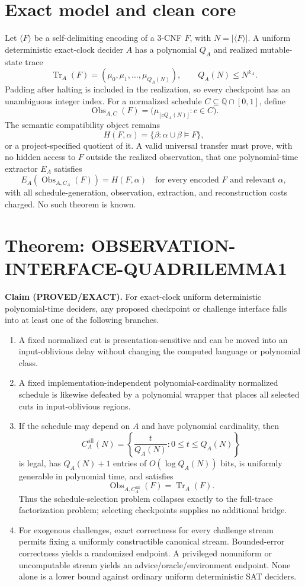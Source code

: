 \documentclass[11pt]{article}
\newcommand{\EXACT}{\textsf{PROVED/EXACT}}
\begin{document}
\section*{Exact model and clean core}
Let $\langle F\rangle$ be a self-delimiting encoding of a 3-CNF $F$, with
$N=|\langle F\rangle|$.  A uniform deterministic exact-clock decider $A$ has a
polynomial $Q_A$ and realized mutable-state trace
\[
  \operatorname{Tr}_A(F)=(\mu_0,\mu_1,\ldots,\mu_{Q_A(N)}),
  \qquad Q_A(N)\le N^{k_A}.
\]
Padding after halting is included in the realization, so every checkpoint has
an unambiguous integer index.  For a normalized schedule
$C\subseteq\mathbb{Q}\cap[0,1]$, define
\[
  \operatorname{Obs}_{A,C}(F)
   =\bigl(\mu_{\lfloor cQ_A(N)\rfloor}:c\in C\bigr).
\]
The semantic compatibility object remains
\[
  H(F,\alpha)=\{\beta:\alpha\cup\beta\models F\},
\]
or a project-specified quotient of it.  A valid universal transfer must prove,
with no hidden access to $F$ outside the realized observation, that one
polynomial-time extractor $E_A$ satisfies
\[
  E_A(\operatorname{Obs}_{A,C_A}(F))=H(F,\alpha)
  \quad\text{for every encoded }F\text{ and relevant }\alpha,
\]
with all schedule-generation, observation, extraction, and reconstruction
costs charged.  No such theorem is known.

\section*{Theorem: OBSERVATION-INTERFACE-QUADRILEMMA1}
\textbf{Claim (\EXACT).}  For exact-clock uniform deterministic polynomial-time
deciders, any proposed checkpoint or challenge interface falls into at least
one of the following branches.

\begin{enumerate}
\item A fixed normalized cut is presentation-sensitive and can be moved into
an input-oblivious delay without changing the computed language or polynomial
class.
\item A fixed implementation-independent polynomial-cardinality normalized
schedule is likewise defeated by a polynomial wrapper that places all selected
cuts in input-oblivious regions.
\item If the schedule may depend on $A$ and have polynomial cardinality, then
\[
 C^{\mathrm{all}}_A(N)=
 \left\{\frac{t}{Q_A(N)}:0\le t\le Q_A(N)\right\}
\]
is legal, has $Q_A(N)+1$ entries of $O(\log Q_A(N))$ bits, is uniformly
generable in polynomial time, and satisfies
\[
 \operatorname{Obs}_{A,C^{\mathrm{all}}_A}(F)
   =\operatorname{Tr}_A(F).
\]
Thus the schedule-selection problem collapses exactly to the full-trace
factorization problem; selecting checkpoints supplies no additional bridge.
\item For exogenous challenges, exact correctness for every challenge stream
permits fixing a uniformly constructible canonical stream.  Bounded-error
correctness yields a randomized endpoint.  A privileged nonuniform or
uncomputable stream yields an advice/oracle/environment endpoint.  None alone
is a lower bound against ordinary uniform deterministic SAT deciders.
\end{enumerate}
\end{document}
